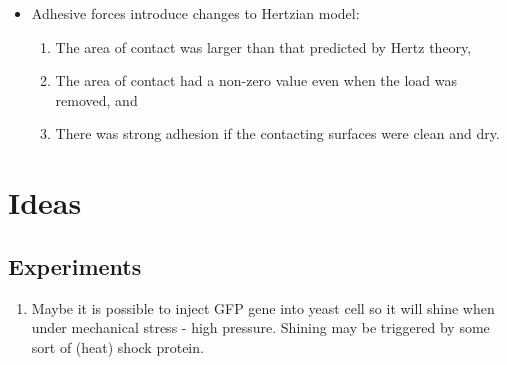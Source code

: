 \documentclass[10pt,a4paper]{article}
\begin{document}
\begin{itemize}
 \item Adhesive forces introduce changes to Hertzian model:
 \begin{enumerate}
  \item The area of contact was larger than that predicted by Hertz theory,
  \item The area of contact had a non-zero value even when the load was removed, and
  \item There was strong adhesion if the contacting surfaces were clean and dry.

 \end{enumerate}



\end{itemize}



\section{Ideas}
\subsection{Experiments}
\begin{enumerate}
 \item Maybe it is possible to inject GFP gene into yeast cell so it will shine when under mechanical stress - high pressure. 
 Shining may be triggered by some sort of (heat) shock protein.
\end{enumerate}

 
\end{document}
